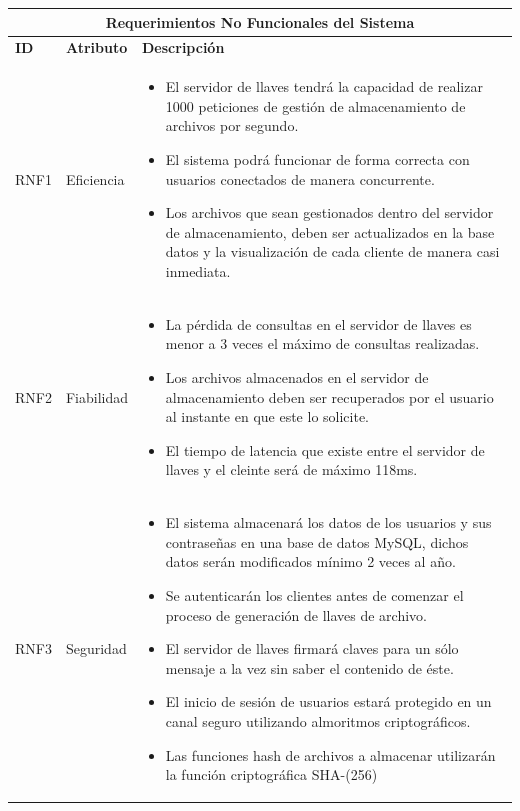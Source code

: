 \begin{table}[htb]
\centering
\begin{tabular}{| p{1.5cm} |  p{2.5cm} | p{11.5cm}|}
\hline
\multicolumn{3}{|c|}{\textbf{Requerimientos No Funcionales del Sistema}} \\ \hline
\textbf{ID} &  \textbf{Atributo} & \textbf{Descripción}\\
\hline \hline
RNF1 & Eficiencia &  \begin{itemize} 
   \item El servidor de llaves tendrá la capacidad de realizar 1000 peticiones de gestión de almacenamiento de archivos por segundo. 
   \item El sistema podrá funcionar de forma correcta con usuarios conectados de manera concurrente. 
   \item Los archivos que sean gestionados dentro del servidor de almacenamiento, deben ser actualizados en la base datos y la visualización de cada cliente de manera casi inmediata. 
 \end{itemize}
\\ \hline

RNF2 & Fiabilidad &  \begin{itemize} 
    \item La pérdida de consultas en el servidor de llaves es menor a 3 veces el máximo de consultas realizadas. 
    \item Los archivos almacenados en el servidor de almacenamiento deben ser recuperados por el usuario al instante en que este lo solicite. 
    \item El tiempo de latencia que existe entre el servidor de llaves y el cleinte será de máximo 118ms. 
 \end{itemize}
\\ \hline

RNF3 & Seguridad & \begin{itemize} 
    \item El sistema almacenará los datos de los usuarios y sus contraseñas en una base de datos MySQL, dichos datos serán modificados mínimo 2  veces al año.  
   \item Se autenticarán los clientes antes de comenzar el proceso de generación de llaves de archivo. 
   \item El servidor de llaves firmará claves para un sólo mensaje a la vez sin saber el contenido de éste. 
   \item El inicio de sesión de usuarios estará protegido en un canal seguro utilizando almoritmos criptográficos. 
   \item Las funciones hash de archivos a almacenar utilizarán la función criptográfica SHA-(256)
 \end{itemize}


\end{tabular}
\end{table}
